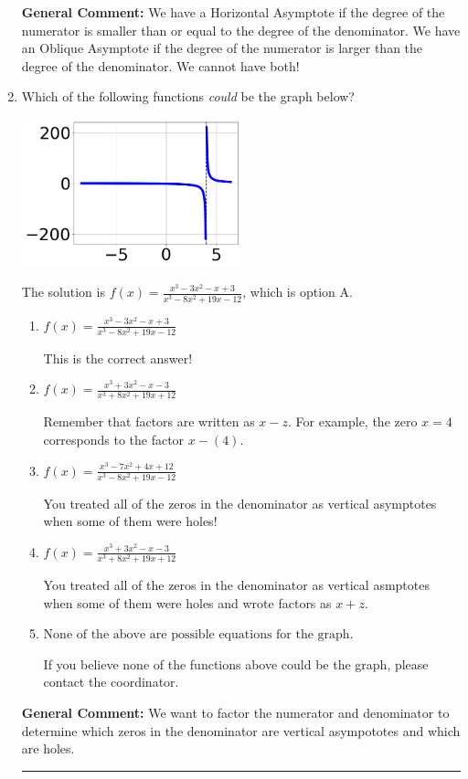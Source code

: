 \documentclass{extbook}[14pt]
\newcommand{\litem}[1]{\item #1

\rule{\textwidth}{0.4pt}}
\begin{document}
\begin{enumerate}
{\textbf{General Comment:} We have a Horizontal Asymptote if the degree of the numerator is smaller than or equal to the degree of the denominator. We have an Oblique Asymptote if the degree of the numerator is larger than the degree of the denominator. We cannot have both!
}
\litem{
Which of the following functions \textit{could} be the graph below?

\begin{center}
    \includegraphics[width=0.5\textwidth]{../Figures/identifyGraphOfRationalFunctionA.png}
\end{center}


The solution is \( f(x)=\frac{x^{3} -3 x^{2} -x + 3}{x^{3} -8 x^{2} +19 x -12} \), which is option A.\begin{enumerate}[label=\Alph*.]
\item \( f(x)=\frac{x^{3} -3 x^{2} -x + 3}{x^{3} -8 x^{2} +19 x -12} \)

This is the correct answer!
\item \( f(x)=\frac{x^{3} +3 x^{2} -x -3}{x^{3} +8 x^{2} +19 x + 12} \)

Remember that factors are written as $x-z$. For example, the zero $x=4$ corresponds to the factor $x-(4)$.
\item \( f(x)=\frac{x^{3} -7 x^{2} +4 x + 12}{x^{3} -8 x^{2} +19 x -12} \)

You treated all of the zeros in the denominator as vertical asymptotes when some of them were holes!
\item \( f(x)=\frac{x^{3} +3 x^{2} -x -3}{x^{3} +8 x^{2} +19 x + 12} \)

You treated all of the zeros in the denominator as vertical asmptotes when some of them were holes and wrote factors as $x+z$.
\item \( \text{None of the above are possible equations for the graph.} \)

If you believe none of the functions above could be the graph, please contact the coordinator.
\end{enumerate}

\textbf{General Comment:} We want to factor the numerator and denominator to determine which zeros in the denominator are vertical asympototes and which are holes.
}
\end{enumerate}
\end{document}

